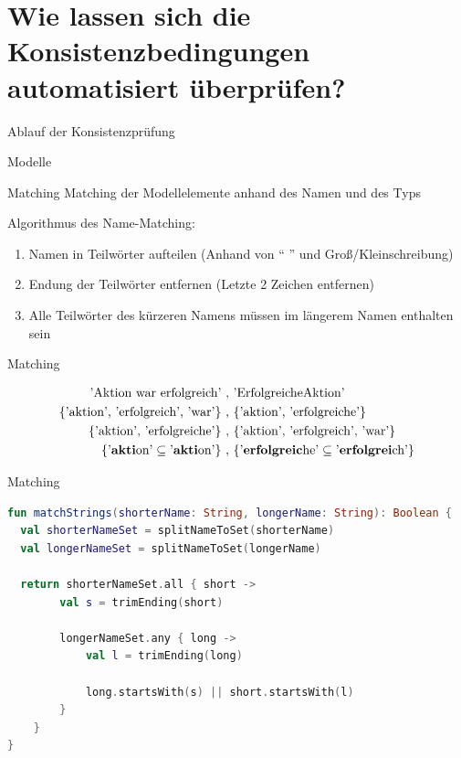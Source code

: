\section{Wie lassen sich die Konsistenzbedingungen automatisiert überprüfen?}

\begin{frame}{Ablauf der Konsistenzprüfung}
  
\end{frame}

\begin{frame}{Modelle}
  
\end{frame}

\begin{frame}{Matching}
  Matching der Modellelemente anhand des Namen und des Typs

  Algorithmus des Name-Matching:
  \begin{enumerate}
    \item Namen in Teilwörter aufteilen (Anhand von `` '' und Groß/Kleinschreibung)
    \item Endung der Teilwörter entfernen (Letzte 2 Zeichen entfernen)
    \item Alle Teilwörter des kürzeren Namens müssen im längerem Namen enthalten sein
  \end{enumerate}
\end{frame}
\begin{frame}{Matching}
  \begin{figure}
    \centering
    \begin{align}
        \text{'Aktion war erfolgreich'}\ ,&\ \text{'ErfolgreicheAktion'} \nonumber\\
        \text{\{'aktion', 'erfolgreich', 'war'\}}\ ,&\ \text{\{'aktion', 'erfolgreiche'\}} \nonumber\\
        \text{\{'aktion', 'erfolgreiche'\}}\ ,&\ \text{\{'aktion', 'erfolgreich', 'war'\}} \nonumber\\
        \text{\{'\textbf{akti}on'} \subseteq \text{'\textbf{akti}on'\}}\ ,&\ \text{\{'\textbf{erfolgreic}he'} \subseteq \text{'\textbf{erfolgrei}ch'\}} \nonumber
    \end{align}
    \label{eq:name_matching}
  \end{figure}
\end{frame}
\begin{frame}[fragile]{Matching}
\begin{lstlisting}[language=Kotlin]
fun matchStrings(shorterName: String, longerName: String): Boolean {
  val shorterNameSet = splitNameToSet(shorterName)
  val longerNameSet = splitNameToSet(longerName)

  return shorterNameSet.all { short ->
        val s = trimEnding(short)

        longerNameSet.any { long ->
            val l = trimEnding(long)

            long.startsWith(s) || short.startsWith(l)
        }
    }
}
\end{lstlisting}
\end{frame}
